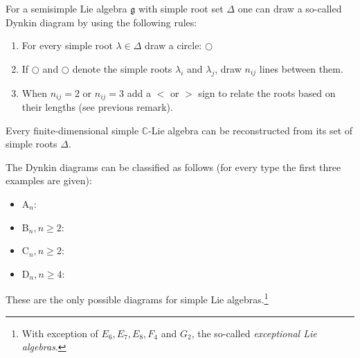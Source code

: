         \begin{construct}
        	For a semisimple Lie algebra $\mathfrak{g}$ with simple root set $\Delta$ one can draw a so-called Dynkin diagram by using the following rules:
        	\begin{enumerate}
        		\item For every simple root $\lambda\in\Delta$ draw a circle: $\bigcirc$
        		\item If $\bigcirc$ and $\bigcirc$ denote the simple roots $\lambda_i$ and $\lambda_j$, draw $n_{ij}$ lines between them.
        		\item When $n_{ij} = 2$ or $n_{ij} = 3$ add a $<$ or $>$ sign to relate the roots based on their lengths (see previous remark).
        	\end{enumerate}
        \end{construct}
        
        \begin{theorem}
        	Every finite-dimensional simple $\mathbb{C}$-Lie algebra can be reconstructed from its set of simple roots $\Delta$.
        \end{theorem}
        
        \begin{method}
        	The Dynkin diagrams can be classified as follows (for every type the first three examples are given):
        	\begin{itemize}
        		\item A$_n$: \begin{center}\dynk {}  \end{center}
			\item B$_n, n\geq2$: \begin{center}   \end{center}
			\item C$_n, n\geq2$: \begin{center}   \end{center}
			\item D$_n, n\geq4$: \begin{center}   \end{center}
        	\end{itemize}
        	These are the only possible diagrams for simple Lie algebras.\footnote{With exception of $E_6, E_7, E_8, F_4$ and $G_2$, the so-called \textit{exceptional Lie algebras}.}
        \end{method}
        
